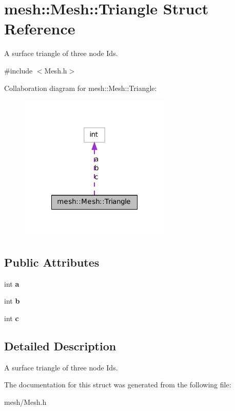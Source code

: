 \hypertarget{structmesh_1_1_mesh_1_1_triangle}{
\section{mesh::Mesh::Triangle Struct Reference}
\label{structmesh_1_1_mesh_1_1_triangle}
}


A surface triangle of three node Ids.  




{\ttfamily \#include $<$Mesh.h$>$}



Collaboration diagram for mesh::Mesh::Triangle:\nopagebreak
\begin{figure}[H]
\begin{center}
\leavevmode
\includegraphics[width=204pt]{structmesh_1_1_mesh_1_1_triangle__coll__graph}
\end{center}
\end{figure}
\subsection*{Public Attributes}
\begin{DoxyCompactItemize}
\item 
\hypertarget{structmesh_1_1_mesh_1_1_triangle_af6f29d96acfd44f49ea9a848a057085b}{
int {\bfseries a}}
\label{structmesh_1_1_mesh_1_1_triangle_af6f29d96acfd44f49ea9a848a057085b}

\item 
\hypertarget{structmesh_1_1_mesh_1_1_triangle_aa94b0cfa8497c59eb3fae0afc32e7b0c}{
int {\bfseries b}}
\label{structmesh_1_1_mesh_1_1_triangle_aa94b0cfa8497c59eb3fae0afc32e7b0c}

\item 
\hypertarget{structmesh_1_1_mesh_1_1_triangle_ad9ad7d8be602ea8e822e05a1ba4f2bc7}{
int {\bfseries c}}
\label{structmesh_1_1_mesh_1_1_triangle_ad9ad7d8be602ea8e822e05a1ba4f2bc7}

\end{DoxyCompactItemize}


\subsection{Detailed Description}
A surface triangle of three node Ids. 

The documentation for this struct was generated from the following file:\begin{DoxyCompactItemize}
\item 
mesh/Mesh.h\end{DoxyCompactItemize}
